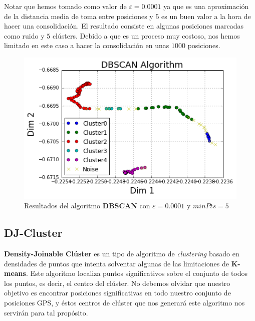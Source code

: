\documentclass[a4paper, 12pt]{article}
\begin{document}
Notar que hemos tomado como valor de $\varepsilon = 0.0001$ ya que es una aproximaci\'on de la distancia media de toma entre posiciones y $5$ es un buen valor a la hora de hacer una consolidaci\'on. El resultado consiste en algunas posiciones marcadas como ruido y $5$ cl\'usters. Debido a que es un proceso muy costoso, nos hemos limitado en este caso a hacer la consolidaci\'on en unas $1000$ posiciones.\\

\begin{figure}[H]
	\begin{center}
	\includegraphics[scale=.7]{dbscan_2_0.png}
	\end{center}
	\caption{Resultados del algoritmo \textbf{DBSCAN} con $\varepsilon = 0.0001$ y $minPts = 5$}
\end{figure}


\subsection{DJ-Cluster}

\textbf{Density-Joinable Cl\'uster}\cite{importantPlaces} es un tipo de algoritmo de \textit{clustering} basado en densidades de puntos que intenta solventar algunas de las limitaciones de \textbf{K-means}. Este algoritmo localiza puntos significativos sobre el conjunto de todos los puntos, es decir, el centro del cl\'uster. No debemos olvidar que nuestro objetivo es encontrar posiciones significativas en todo nuestro conjunto de posiciones GPS, y \'estos centros de cl\'uster que nos generar\'a este algoritmo nos servir\'an para tal prop\'osito. \\
\end{document}
